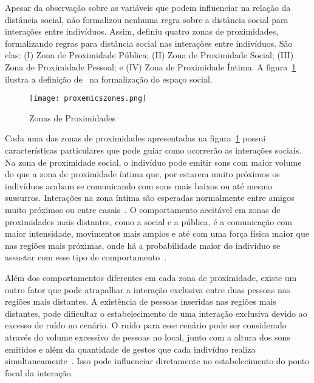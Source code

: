 Apesar da observação sobre as variáveis que podem influenciar na relação da distância social, \textcite{hall:1969} não formalizou nenhuma regra sobre a distância social para interações entre indivíduos. Assim, \textcite{argyle:1988} definiu quatro zonas de proximidades, formalizando regras para distância social nas interações entre indivíduos. São elas: (I) Zona de Proximidade Pública; (II) Zona de Proximidade Social; (III) Zona de Proximidade Pessoal; e (IV) Zona de Proximidade Íntima. A figura~\ref{fig:proximityzones} ilustra a definição de~\textcite{argyle:1988} na formalização do espaço social.

\begin{figure}[ht!]
	\centering
	\begin{minipage}{\textwidth}
		\caption{Zonas de Proximidades}
		\texttt{[image: proxemicszones.png]}
		\label{fig:proximityzones}
	\end{minipage}
\end{figure}

Cada uma das zonas de proximidades apresentadas na figura~\ref{fig:proximityzones} possui características particulares que pode guiar como ocorrerão as interações sociais. Na zona de proximidade social, o indivíduo pode emitir sons com maior volume do que a zona de proximidade íntima que, por estarem muito próximos os indivíduos acabam se comunicando com sons mais baixos ou até mesmo sussurros. Interações na zona íntima são esperadas normalmente entre amigos muito próximos ou entre casais~\cite{hall:1969, argyle:1988}. O comportamento aceitável em zonas de proximidades mais distantes, como a social e a pública, é a comunicação com maior intensidade, movimentos mais amplos e até com uma força física maior que nas regiões mais próximas, onde há a probabilidade maior do indivíduo se assustar com esse tipo de comportamento~\cite{henkel:2014}.

Além dos comportamentos diferentes em cada zona de proximidade, existe um outro fator que pode atrapalhar a interação exclusiva entre duas pessoas nas regiões mais distantes. A existência de pessoas inseridas nas regiões mais distantes, pode dificultar o estabelecimento de uma interação exclusiva devido ao excesso de ruído no cenário. O ruído para esse cenário pode ser considerado através do volume excessivo de pessoas no local, junto com a altura dos sons emitidos e além da quantidade de gestos que cada indivíduo realiza simultaneamente~\cite{walters:2009, henkel:2014}. Isso pode influenciar diretamente no estabelecimento do ponto focal da interação.


